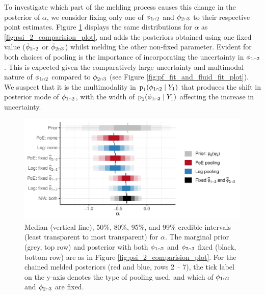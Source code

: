 \documentclass[
  10pt,
  a4paper,
]{article}
\let\Oldcap\cap
\renewcommand{\cap}{\mathrel{\mathsmaller{\Oldcap}}}
\newcommand{\pd}{\text{p}}
\begin{document}
To investigate which part of the melding process causes this change in
the posterior of \(\alpha\), we consider fixing only one of
\(\phi_{1 \cap 2}\) and \(\phi_{2 \cap 3}\) to their respective point
estimates. Figure \ref{fig:alpha_only_comparision_plot} displays the
same distributions for \(\alpha\) as \ref{fig:psi_2_comparision_plot},
and adds the posteriors obtained using one fixed value
(\(\tilde{\phi}_{1 \cap 2}\) or \(\tilde{\phi}_{2 \cap 3}\)) whilst
melding the other non-fixed parameter. Evident for both choices of
pooling is the importance of incorporating the uncertainty in
\(\phi_{1 \cap 2}\). This is expected given the comparatively large
uncertainty and multimodal nature of \(\phi_{1 \cap 2}\) compared to
\(\phi_{2 \cap 3}\) (see Figure \ref{fig:pf_fit_and_fluid_fit_plot}). We
suspect that it is the multimodality in
\(\pd_{1}(\phi_{1 \cap 2} \mid Y_{1})\) that produces the shift in
posterior mode of \(\phi_{1 \cap 2}\), with the width of
\(\pd_{1}(\phi_{1 \cap 2} \mid Y_{1})\) affecting the increase in
uncertainty.

\begin{figure}

{\centering \includegraphics{../plots/mimic-example/psi-2-alpha-only-compare} 

}

\caption{Median (vertical line), 50\%, 80\%, 95\%, and 99\% credible intervals (least transparent to most transparent) for $\alpha$. The marginal prior (grey, top row) and posterior with both $\phi_{1 \cap 2}$ and $\phi_{2 \cap 3}$ fixed (black, bottom row) are as in Figure \ref{fig:psi_2_comparision_plot}. For the chained melded posteriors (red and blue, rows 2 -- 7), the tick label on the y-axis denotes the type of pooling used, and which of $\phi_{1 \cap 2}$ and $\phi_{2 \cap 3}$ are fixed.}\label{fig:alpha_only_comparision_plot}
\end{figure}
\end{document}
